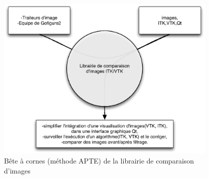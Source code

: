 \begin{figure}[H]
\begin{center}
\leavevmode
\includegraphics[width=0.95\textwidth]{pictures/CompareBAC}
\end{center}
\caption{Bête à cornes (méthode {APTE\textregistered}) de la librairie de comparaison d'images}
\label{fig:BACCompare}
\end{figure}


